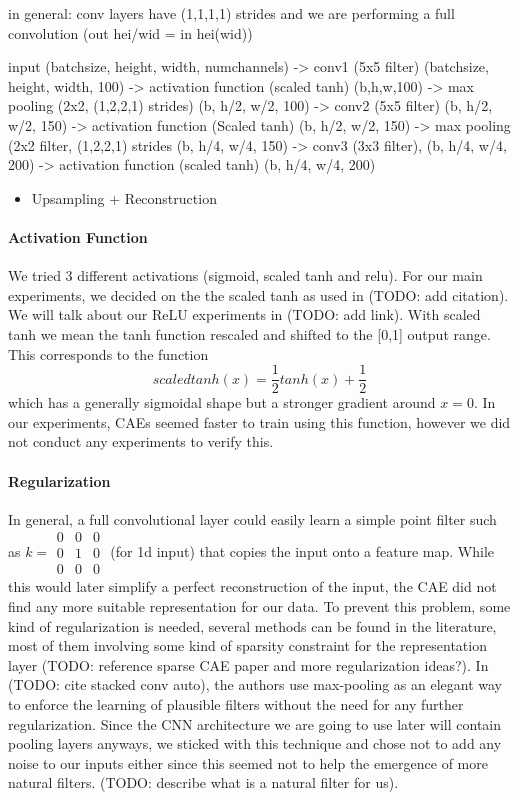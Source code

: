 \documentclass[draft]{article}
\begin{document}
    in general: conv layers have (1,1,1,1) strides and we are performing a full convolution (out hei/wid = in hei(wid))

    input (batchsize, height, width, numchannels) -> conv1 (5x5 filter) (batchsize, height, width, 100) -> activation function (scaled tanh) (b,h,w,100) -> max pooling (2x2, (1,2,2,1) strides) (b, h/2, w/2, 100) -> conv2 (5x5 filter) (b, h/2, w/2, 150) -> activation function (Scaled tanh) (b, h/2, w/2, 150) -> max  pooling (2x2 filter, (1,2,2,1) strides (b, h/4, w/4, 150) -> conv3 (3x3 filter), (b, h/4, w/4, 200) -> activation function (scaled tanh) (b, h/4, w/4, 200) 

    \begin{itemize}
      \item Upsampling + Reconstruction
    \end{itemize}

    \paragraph{Activation Function} We tried 3 different activations (sigmoid, scaled tanh and relu). For our main experiments, we decided on the the scaled tanh as used in (TODO: add citation). We will talk about our ReLU experiments in (TODO: add link). With scaled tanh we mean the tanh function rescaled and shifted to the [0,1] output range. This corresponds to the function $$scaledtanh(x) = \frac{1}{2}tanh(x) + \frac{1}{2}$$ which has a generally sigmoidal shape but a stronger gradient around $x = 0$. In our experiments, CAEs seemed faster to train using this function, however we did not conduct any experiments to verify this.

    \paragraph{Regularization} In general, a full convolutional layer could easily learn a simple point filter such as $k = \begin{smallmatrix} 0&0&0\\ 0&1&0 \\ 0&0&0 \end{smallmatrix}$ (for 1d input) that copies the input onto a feature map. While this would later simplify a perfect reconstruction of the input, the CAE did not find any more suitable representation for our data. To prevent this problem, some kind of regularization is needed, several methods can be found in the literature, most of them involving some kind of sparsity constraint for the representation layer (TODO: reference sparse CAE paper and more regularization ideas?). In (TODO: cite stacked conv auto), the authors use max-pooling as an elegant way to enforce the learning of plausible filters without the need for any further regularization. Since the CNN architecture we are going to use later will contain pooling layers anyways, we sticked with this technique and chose not to add any noise to our inputs either since this seemed not to help the emergence of more natural filters. (TODO: describe what is a natural filter for us). 
\end{document}
